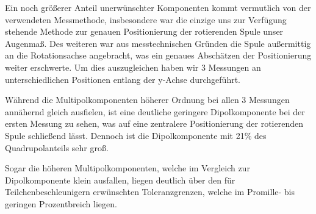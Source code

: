 \documentclass[bigchapter,colorback,accentcolor=tud4b,linedtoc,11pt]{tudreport}
\begin{document}
Ein noch größerer Anteil unerwünschter Komponenten kommt vermutlich von der verwendeten Messmethode, insbesondere war die einzige uns zur Verfügung stehende Methode zur genauen Positionierung der rotierenden Spule unser Augenmaß. Des weiteren war aus messtechnischen Gründen die Spule außermittig an die Rotationsachse angebracht, was ein genaues Abschätzen der Positionierung weiter erschwerte. Um dies auszugleichen haben wir 3 Messungen an unterschiedlichen Positionen entlang der y-Achse durchgeführt.

\begin{center}
\begin{figure}[H]
\end{figure}
\end{center}

Während die Multipolkomponenten höherer Ordnung bei allen 3 Messungen annähernd gleich ausfielen, ist eine deutliche geringere Dipolkomponente bei der ersten Messung zu sehen, was auf eine zentralere Positionierung der rotierenden Spule schließend lässt. Dennoch ist die Dipolkomponente mit 21\% des Quadrupolanteils sehr groß.

Sogar die höheren Multipolkomponenten, welche im Vergleich zur Dipolkomponente klein ausfallen, liegen deutlich über den für Teilchenbeschleunigern erwünschten Toleranzgrenzen, welche im Promille- bis geringen Prozentbreich liegen.
\end{document}

